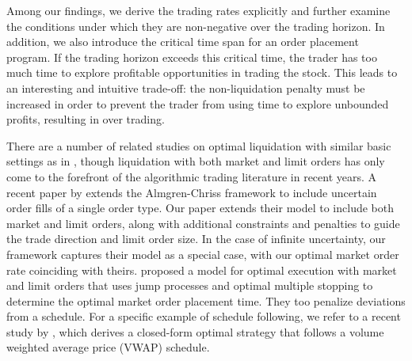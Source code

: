 \documentclass[12pt, letterpaper]{article}
\numberwithin{equation}{section}
\numberwithin{theorem}{section}
\begin{document}
Among our findings, we derive the trading rates explicitly and further examine the conditions under which they are non-negative over the trading horizon. In addition, we also introduce the critical time span for an order placement program. If the trading horizon exceeds this critical time, the trader has too much time to explore profitable opportunities in trading the stock. This leads to an interesting and intuitive trade-off: the non-liquidation penalty must be increased in order to prevent the trader from using time to explore unbounded profits, resulting in over trading. 

There are a number of related studies on  optimal liquidation with similar basic settings as in \cite{AC2000}, though liquidation with both market and limit orders has only come to the forefront of the algorithmic trading literature in recent years. A recent paper by \cite{TaiHoACF} extends the Almgren-Chriss framework to include uncertain order fills of a single order type. Our paper extends their model to include both market and limit orders, along with additional constraints and penalties to guide the trade direction and limit order size. In the case of infinite uncertainty, our framework captures their model as a special case, with our optimal market order rate coinciding with theirs. \cite{SeblimitmarketQF2015} proposed a model for optimal execution with market and limit orders that uses jump processes and optimal multiple stopping to determine the optimal market order placement time. They too penalize deviations from a schedule. For a specific example of schedule following, we refer to a recent study by \cite{sebVWAP},  which derives  a  closed-form   optimal strategy that  follows a volume weighted average price (VWAP) schedule.

\end{document}
